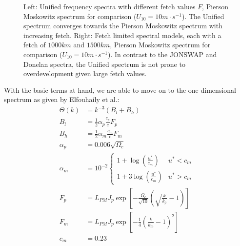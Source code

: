 \begin{figure}
\caption{Left: Unified frequency spectra with different fetch values $F$, 
Pierson Moskowitz spectrum for comparison ($U_{10} = 10m\cdot s^{-1}$).
The Unified spectrum converges towards the Pierson Moskowitz spectrum with
increasing fetch. Right: Fetch limited spectral models, each with a fetch of
$1000km$ and $1500km$, Pierson Moskowitz spectrum for comparison
($U_{10} = 10m\cdot s^{-1}$). In contrast to the JONSWAP and Donelan spectra,
the Unified spectrum is not prone to overdevelopment given large fetch values.
}
\label{fig:unified_spectra}
\end{figure}
%
With the basic terms at hand, we are able to move on to the one dimensional 
\wavenumber spectrum as given by Elfouhaily et al.:
%
\begin{subequations}
\begin{align}
 \Theta(k) &= k^{-3}(B_l + B_h) \\
 B_l &= \frac{1}{2}\alpha_p\frac{c_p}{c}F_p \\
 B_h &= \frac{1}{2}\alpha_m\frac{c_m}{c}F_m \\
 \alpha_p &= 0.006\sqrt{\Omega_c} \\
 \alpha_m &= 10^{-2}\begin{cases}
	1 + \log\left(\frac{u^{\ast}}{c_m}\right) & u^{\ast} < c_m \\
	1 + 3\log\left(\frac{u^{\ast}}{c_m}\right) & u^{\ast} > c_m
	\end{cases} \\
 F_p &= L_{PM}J_p\exp\left[- 
\frac{\Omega_c}{\sqrt{10}}\left(\sqrt{\frac{k}{k_p}} - 1\right)\right] \\
 F_m &= L_{PM}J_p\exp\left[- 
\frac{1}{4}\left(\frac{k}{k_m} - 1\right)^2\right] \\
c_m &= 0.23
\end{align}
\end{subequations}

